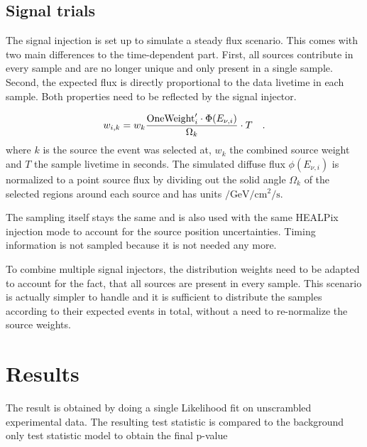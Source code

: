 

\subsection*{Signal trials}
The signal injection is set up to simulate a steady flux scenario.
This comes with two main differences to the time-dependent part.
First, all sources contribute in every sample and are no longer unique and only present in a single sample.
Second, the expected flux is directly proportional to the data livetime in each sample.
Both properties need to be reflected by the signal injector.

\begin{equation}
  w_{i,k} = w_k \frac{\text{OneWeight}'_i \cdot
    \Phi(E_{\nu,i})}{\Omega_k} \cdot T
  \quad\text{.}
\end{equation}
where $k$ is the source the event was selected at, $w_k$ the combined source weight and $T$ the sample livetime in seconds.
The simulated diffuse flux $\phi(E_{\nu,i})$ is normalized to a point source flux by dividing out the solid angle $\Omega_k$ of the selected regions around each source and has units $\si{\per\GeV\per\cm\squared\per\second}$.

The sampling itself stays the same and is also used with the same HEALPix injection mode to account for the source position uncertainties.
Timing information is not sampled because it is not needed any more.

To combine multiple signal injectors, the distribution weights need to be adapted to account for the fact, that all sources are present in every sample.
This scenario is actually simpler to handle and it is sufficient to distribute the samples according to their expected events in total, without a need to re-normalize the source weights.


\section{Results}
The result is obtained by doing a single Likelihood fit on unscrambled experimental data.
The resulting test statistic is compared to the background only test statistic model to obtain the final p-value

